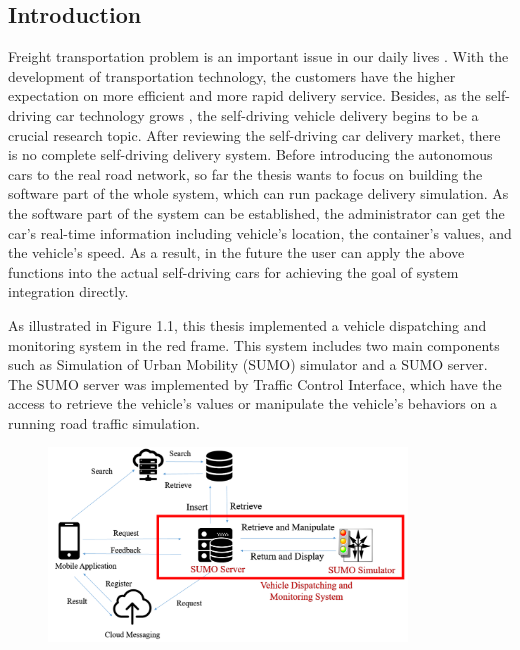 \documentclass[12pt]{ksthesis}
\begin{document}
\begin{thesis}\large {
\chapter{Introduction} \label{Chap:Introduction}

Freight transportation problem is an important issue in our daily lives \cite{Anand2012} . With the development of transportation technology, the customers have the higher expectation on more efficient and more rapid delivery service. Besides, as the self-driving car technology grows \cite{Lutin2013}, the self-driving vehicle delivery begins to be a crucial research topic. After reviewing the self-driving car delivery market, there is no complete self-driving delivery system. 
Before introducing the autonomous cars to the real road network, so far the thesis wants to focus on building the software part of the whole system, which can run package delivery simulation. As the software part of the system can be established, the administrator can get the car’s real-time information including vehicle’s location, the container’s values, and the vehicle’s speed. As a result, in the future the user can apply the above functions into the actual self-driving cars for achieving the goal of system integration directly.

As illustrated in Figure 1.1, this thesis implemented a vehicle dispatching and monitoring system in the red frame. This system includes two main components such as Simulation of Urban Mobility (SUMO) simulator and a SUMO server. The SUMO server was implemented by Traffic Control Interface, which have the access to retrieve the vehicle’s values or manipulate the vehicle’s behaviors on a running road traffic simulation.

\begin{figure}[t!]
\centering
\includegraphics[width=0.85\textwidth]{./Thesis_figures/F1-1_System_Design_Overview.PNG}


\end{figure}}
\end{thesis}
\end{document}
